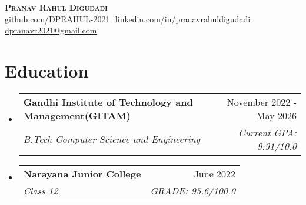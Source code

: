 \documentclass[11pt]{article}
\makeatletter
\newcommand{\resumeSubheading}[4]{
  \vspace{-2pt}\item
    \begin{tabular*}{0.97\textwidth}[t]{l@{\extracolsep{\fill}}r}
      \textbf{#1} & #2 \\
      \textit{\small#3} & \textit{\small #4} \\
    \end{tabular*}\vspace{-7pt}
}
\newcommand{\resumeSubHeadingListStart}{\begin{itemize}[leftmargin=0.15in, label={}]}
\newcommand{\resumeSubHeadingListEnd}{\end{itemize}}
\makeatother
\begin{document}
\begin{flushright}
  \color{gray}
  \item
\end{flushright}

\vspace{-5pt}

\begin{center}
    \textbf{\Huge \scshape Pranav Rahul Digudadi} \\ \vspace{8pt}
    \small 
    \href{https://github.com/DPRAHUL-2021}{\underline{github.com/DPRAHUL-2021}} $  $
    \href{www.linkedin.com/in/pranavrahuldigudadi}{\underline{linkedin.com/in/pranavrahuldigudadi}} $  $
    \href{mailto:dpranavr2021@gmail.com}
    {\underline{dpranavr2021@gmail.com}}
\end{center}

\section{Education}
  \resumeSubHeadingListStart
  
    \resumeSubheading
      {Gandhi Institute of Technology and Management(GITAM)}{November 2022 - May 2026}
      {B.Tech Computer Science and Engineering}{Current GPA: 9.91/10.0}
      \vspace{5pt}
    \resumeSubheading
      {Narayana Junior College }{June 2022}
      {Class 12}{GRADE: 95.6/100.0}

  \resumeSubHeadingListEnd

  

    
\end{document}
